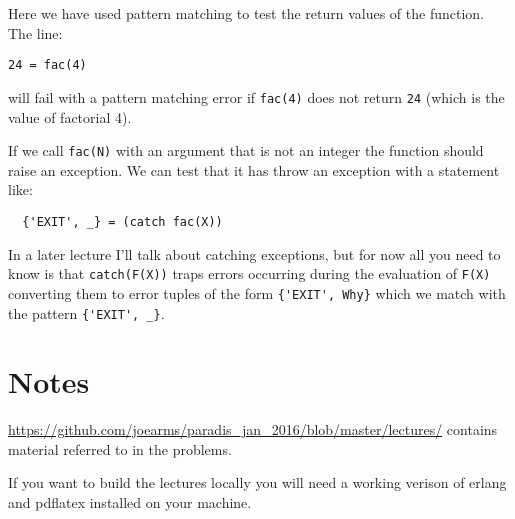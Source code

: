 \documentclass[12pt]{hitec}
\begin{document}
Here we have used pattern matching to test the return values of the function.
The line:
\begin{verbatim}
24 = fac(4)
\end{verbatim}

will fail with a pattern matching error if \verb+fac(4)+ does not return  \verb+24+
(which is the value of factorial 4).

If we call \verb+fac(N)+ with an argument that is not an integer the function
should raise an exception. We can test that it has throw an exception with a
statement like:

\begin{verbatim}
  {'EXIT', _} = (catch fac(X))
\end{verbatim}

In a later lecture I'll talk about catching exceptions, but for now all you need
to know is that \verb+catch(F(X))+ traps errors occurring during the evaluation
of \verb+F(X)+ converting them to error tuples of the form \verb+{'EXIT', Why}+
which we match with the pattern \verb+{'EXIT', _}+.

\section*{Notes}

\href{https://github.com/joearms/paradis\_jan\_2016/blob/master/lectures/}
     {https://github.com/joearms/paradis\_jan\_2016/blob/master/lectures/}
     contains material referred to in the problems.
     
If you want to build the lectures locally you will need a working verison
of erlang and pdflatex installed on your machine.
\end{document}
